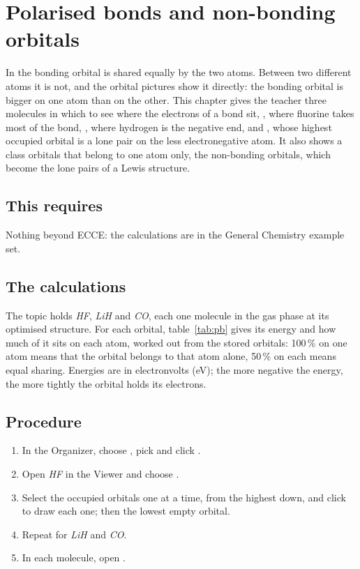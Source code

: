\chapter{Polarised bonds and non-bonding orbitals}
\label{ch:t-polarised-bonds}

In  the bonding orbital is shared equally by the two atoms. Between two different atoms it is not, and the orbital pictures show it directly: the bonding orbital is bigger on one atom than on the other. This chapter gives the teacher three molecules in which to see where the electrons of a bond sit, , where fluorine takes most of the bond, , where hydrogen is the negative end, and , whose highest occupied orbital is a lone pair on the less electronegative atom. It also shows a class orbitals that belong to one atom only, the non-bonding orbitals, which become the lone pairs of a Lewis structure.

\section*{This requires}
Nothing beyond ECCE: the calculations are in the General Chemistry example set.

\section{The calculations}
The topic  holds \emph{HF}, \emph{LiH} and \emph{CO}, each one molecule in the gas phase at its optimised structure. For each orbital, table~\ref{tab:pb} gives its energy and how much of it sits on each atom, worked out from the stored orbitals: 100\,\% on one atom means that the orbital belongs to that atom alone, 50\,\% on each means equal sharing. Energies are in electronvolts (eV); the more negative the energy, the more tightly the orbital holds its electrons.

\section{Procedure}
\begin{enumerate}
	\item In the Organizer, choose , pick  and click .
	\item Open \emph{HF} in the Viewer and choose .
	\item Select the occupied orbitals one at a time, from the highest down, and click  to draw each one; then the lowest empty orbital.
	\item Repeat for \emph{LiH} and \emph{CO}.
	\item In each molecule, open .
\end{enumerate}

